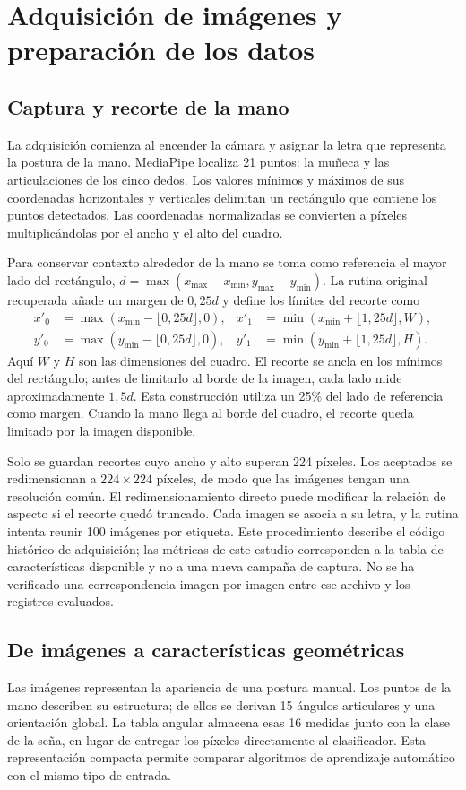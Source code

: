 \documentclass[11pt,a4paper]{article}
\begin{document}
\section{Adquisición de imágenes y preparación de los datos}
\subsection{Captura y recorte de la mano}
La adquisición comienza al encender la cámara y asignar la letra que representa la postura de la mano. MediaPipe localiza 21 puntos: la muñeca y las articulaciones de los cinco dedos. Los valores mínimos y máximos de sus coordenadas horizontales y verticales delimitan un rectángulo que contiene los puntos detectados. Las coordenadas normalizadas se convierten a píxeles multiplicándolas por el ancho y el alto del cuadro.

Para conservar contexto alrededor de la mano se toma como referencia el mayor lado del rectángulo, $d=\max(x_{\max}-x_{\min},y_{\max}-y_{\min})$. La rutina original recuperada añade un margen de $0{,}25d$ y define los límites del recorte como
\begin{align}
x'_0&=\max(x_{\min}-\lfloor0{,}25d\rfloor,0), &
x'_1&=\min(x_{\min}+\lfloor1{,}25d\rfloor,W),\\
y'_0&=\max(y_{\min}-\lfloor0{,}25d\rfloor,0), &
y'_1&=\min(y_{\min}+\lfloor1{,}25d\rfloor,H).
\end{align}
Aquí $W$ y $H$ son las dimensiones del cuadro. El recorte se ancla en los mínimos del rectángulo; antes de limitarlo al borde de la imagen, cada lado mide aproximadamente $1{,}5d$. Esta construcción utiliza un 25\% del lado de referencia como margen. Cuando la mano llega al borde del cuadro, el recorte queda limitado por la imagen disponible.

Solo se guardan recortes cuyo ancho y alto superan 224 píxeles. Los aceptados se redimensionan a $224\times224$ píxeles, de modo que las imágenes tengan una resolución común. El redimensionamiento directo puede modificar la relación de aspecto si el recorte quedó truncado. Cada imagen se asocia a su letra, y la rutina intenta reunir 100 imágenes por etiqueta. Este procedimiento describe el código histórico de adquisición; las métricas de este estudio corresponden a la tabla de características disponible y no a una nueva campaña de captura. No se ha verificado una correspondencia imagen por imagen entre ese archivo y los registros evaluados.

\subsection{De imágenes a características geométricas}
Las imágenes representan la apariencia de una postura manual. Los puntos de la mano describen su estructura; de ellos se derivan 15 ángulos articulares y una orientación global. La tabla angular almacena esas 16 medidas junto con la clase de la seña, en lugar de entregar los píxeles directamente al clasificador. Esta representación compacta permite comparar algoritmos de aprendizaje automático con el mismo tipo de entrada.
\end{document}
